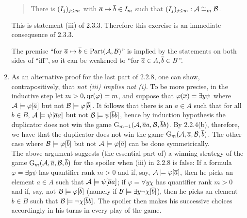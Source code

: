 \begin{enumerate}[1.]
\begin{quote}
There is $(I_j)_{j \leq m}$ with $\overline{a} \mapsto \overline{b} \in I_m$ such that $\seqi{I_j}{j \leq m} : \strct{A} \isom[m] \strct{B}$.
\end{quote}
This is statement (iii) of 2.3.3. Therefore this exercise is an immediate consequence of 2.3.3.
\begin{remark}
The premise ``for $\overline{a} \mapsto \overline{b} \in {\mathrm{Part}(\mathcal{A}, \mathcal{B})}$'' is implied by the statements on both sides of ``iff'', so it can be weakened to ``for $\overline{a} \in A, \overline{b} \in B$''.
\end{remark}
%
\item {} As an alternative proof for the last part of 2.2.8, one can show, contrapositively, that \emph{not (iii) implies not (i)}. To be more precise, in the inductive step let $m > 0, {\mathrm{qr}({\varphi})} = m$, and suppose that $\varphi(\overline{x}) = \exists y \psi$ where $\mathcal{A} \models \varphi[\overline{a}]$ but not $\mathcal{B} \models \varphi[\overline{b}]$. It follows that there is an $a \in A$ such that for all $b \in B$, $\mathcal{A} \models \psi[\overline{a}a]$ but not $\mathcal{B} \models \psi[\overline{b}b]$, hence by induction hypothesis the duplicator does not win the game $\game{m - 1}{\strct{A}, \vect{a}a, \strct{B}, \vect{b}b}$. By 2.2.4(b), therefore, we have that the duplicator does not win the game $\game{m}{\strct{A}, \vect{a}, \strct{B}, \vect{b}}$. The other case where $\mathcal{B} \models \varphi[\overline{b}]$ but not $\mathcal{A} \models \varphi[\overline{a}]$ can be done symmetrically.
\medskip\\
The above argument suggests (the essential part of) a winning strategy of the game $\game{m}{\strct{A}, \vect{a}, \strct{B}, \vect{b}}$ for the spoiler when (iii) in 2.2.8 is false: If a formula $\varphi = \exists y \psi$ has quantifier rank $m > 0$ and if, say, $\mathcal{A} \models \varphi[\overline{a}]$, then he picks an element $a \in A$ such that $\mathcal{A} \models \psi[\overline{a}a]$; if $\varphi = \forall y \chi$ has quantifier rank $m > 0$ and if, say, not $\mathcal{B} \models \varphi[\overline{b}]$ (namely if $\mathcal{B} \models \exists y \neg\chi[\overline{b}]$), then he picks an element $b \in B$ such that $\mathcal{B} \models \neg\chi[\overline{b}b]$. The spoiler then makes his successive choices accordingly in his turns in every play of the game.
%
\end{enumerate}
